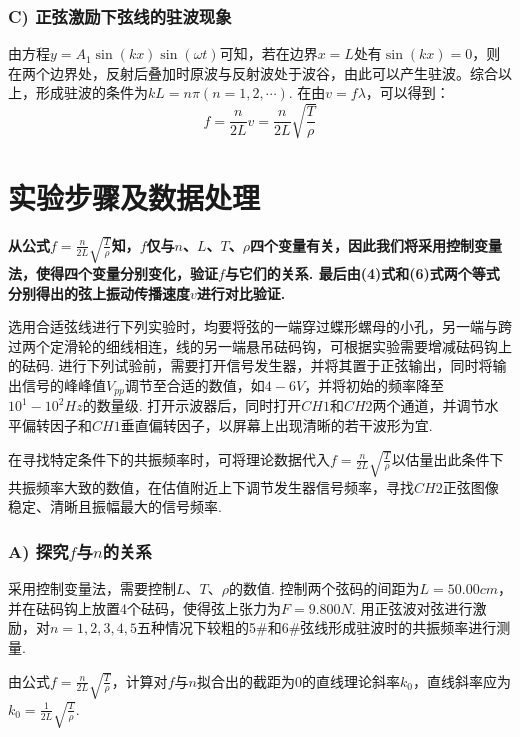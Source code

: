 \documentclass[UTF8]{ctexart}
\begin{document}
\subsubsection*{C) 正弦激励下弦线的驻波现象}
\songti 由方程$y = A_1\sin(kx)\sin(\omega t)$可知，若在边界$x = L$处有$\sin(kx) = 0$，则在两个边界处，反射后叠加时原波与反射波处于波谷，由此可以产生驻波。综合以上，形成驻波的条件为$kL = n\pi (n = 1,2,\cdots)$. 在由$v = f\lambda$，可以得到：
\begin{equation}
\displaystyle{f = \frac{n}{2L}v = \frac{n}{2L}\sqrt{\frac{T}{\rho}}}\label{f}
\end{equation}


\section{实验步骤及数据处理}
\songti \textbf{从公式${f = \frac{n}{2L}\sqrt{\frac{T}{\rho}}}$知，$f$仅与$n$、$L$、$T$、$\rho$四个变量有关，因此我们将采用控制变量法，使得四个变量分别变化，验证$f$与它们的关系. 最后由(4)式和(6)式两个等式分别得出的弦上振动传播速度$v$进行对比验证.}\par
\songti 选用合适弦线进行下列实验时，均要将弦的一端穿过蝶形螺母的小孔，另一端与跨过两个定滑轮的细线相连，线的另一端悬吊砝码钩，可根据实验需要增减砝码钩上的砝码. 
\songti 进行下列试验前，需要打开信号发生器，并将其置于正弦输出，同时将输出信号的峰峰值$V_{pp}$调节至合适的数值，如$4 - 6V$，并将初始的频率降至$10^1 - 10^2Hz$的数量级. 打开示波器后，同时打开$CH1$和$CH2$两个通道，并调节水平偏转因子和$CH1$垂直偏转因子，以屏幕上出现清晰的若干波形为宜.\par
\songti 在寻找特定条件下的共振频率时，可将理论数据代入${f = \frac{n}{2L}\sqrt{\frac{T}{\rho}}}$以估量出此条件下共振频率大致的数值，在估值附近上下调节发生器信号频率，寻找$CH2$正弦图像稳定、清晰且振幅最大的信号频率.\par



\subsubsection*{A) 探究$f$与$n$的关系}
采用控制变量法，需要控制$L$、$T$、$\rho$的数值. 控制两个弦码的间距为$L = 50.00cm$，并在砝码钩上放置4个砝码，使得弦上张力为$F = 9.800N$. 用正弦波对弦进行激励，对$n = 1, 2, 3, 4, 5$五种情况下较粗的5\#和6\#弦线形成驻波时的共振频率进行测量.\par
由公式${f = \frac{n}{2L}\sqrt{\frac{T}{\rho}}}，$计算对$f$与$n$拟合出的截距为0的直线理论斜率$k_0$，直线斜率应为$k_0=\frac{1}{2L}\sqrt{\frac{T}{\rho}}$.
\end{document}

